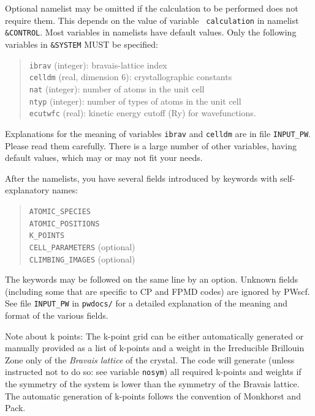\documentclass[12pt]{article}
\begin{document}
Optional namelist may be omitted if the calculation to be performed does
not require them. This depends on the value of variable {\tt
calculation} in namelist {\tt \&CONTROL}.  Most variables in namelists
have default values.  Only the following variables in {\tt \&SYSTEM}
MUST be specified:
\begin{quote}
{\tt ibrav} (integer): bravais-lattice index\\
{\tt celldm} (real, dimension 6): crystallographic constants\\
{\tt nat} (integer): number of atoms in the unit cell\\
{\tt ntyp} (integer): number of types of atoms in the unit cell\\
{\tt ecutwfc} (real): kinetic energy cutoff (Ry) for wavefunctions.
\end{quote}

Explanations for the meaning of variables {\tt ibrav} and {\tt celldm}
are in file {\tt INPUT\_PW}. Please read them carefully. There is a
large number of other variables, having default values, which may or may
not fit your needs.

After the namelists, you have several fields introduced by keywords with
self-explanatory names:

\begin{quote}
{\tt ATOMIC\_SPECIES}\\
{\tt ATOMIC\_POSITIONS}\\
{\tt K\_POINTS}\\
{\tt CELL\_PARAMETERS} (optional) \\
{\tt CLIMBING\_IMAGES} (optional)
\end{quote}

The keywords may be followed on the same line by an option.  Unknown
fields (including some that are specific to CP and FPMD codes) are
ignored by PWscf.  See file {\tt INPUT\_PW} in {\tt pwdocs/} for a
detailed explanation of the meaning and format of the various fields.

Note about k points:
The k-point grid can be either automatically generated or manually
provided as a list of k-points and a weight in the Irreducible Brillouin
Zone only of the {\em Bravais lattice} of the crystal. The code will
generate (unless instructed not to do so: see variable {\tt nosym}) all
required k-points and weights if the symmetry of the system is lower
than the symmetry of the Bravais lattice.  The automatic generation of
k-points follows the convention of Monkhorst and Pack.
\end{document}
